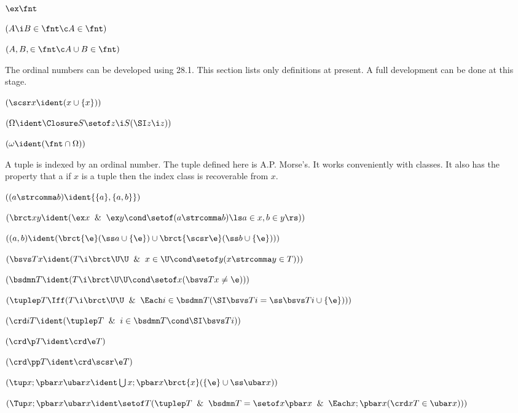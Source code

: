 

 $\ex\fnt$

 $(A\i  B \in \fnt \c A \in \fnt)$

 $(A,B, \in \fnt \c A \cup B\in \fnt)$
\lineb


The ordinal numbers can be developed using 28.1.  
This section lists only definitions at present.  A full development
can be done at this stage.
\lineb

 $(\scsr x \ident (x \cup \{x\}))$

 $(\Omega \ident \Closure S \setof z \i S (\SI z \i z))$

 $(\omega \ident (\fnt \cap \Omega))$
\lineb


	\lineb  

A tuple is indexed by an ordinal number.
The tuple defined here is A.P. Morse's.  It works conveniently with
classes.  It also has the property that a if $x$ is a tuple then
the index class is recoverable from $x$.  
\lineb




 $((a \strcomma b) \ident \{\{a\},\{a,b\}\})$
 
 $(\brct x y \ident (\ex x \And \ex y \cond\setof (a\strcomma b)\ls a \in x, b \in y\rs))$

 $((a, b) \ident (\brct \{\e\} (\ss a \cup\{\e\})\cup \brct \{\scsr \e\}(\ss b\cup\{\e\})))$

 $(\bsvs Tx \ident (T \i \brct \U \U \And x \in \U \cond \setof y 
(x\strcomma y\in T)))$

 $(\bsdmn T \ident (T \i \brct \U\U \cond \setof x (\bsvs Tx \ne \e)))$

 $(\tuplep T \Iff (T \i \brct \U\U \And \Each i \in \bsdmn T
(\SI \bsvs Ti = \ss \bsvs Ti \cup \{\e\})))$

 $(\crd i T \ident (\tuplep T \And i \in \bsdmn T \cond \SI \bsvs Ti))$

 $(\crd\p T \ident \crd \e T)$

 $(\crd\pp T \ident \crd \scsr\e T)$

 $(\tup x; \pbar x \ubar x \ident \bigcup x; \pbar x 
	\brct \{x\} (\{\e\}\cup \ss \ubar x))$ 

 $(\Tup x; \pbar x \ubar x \ident 
\setof T (\tuplep T \And \bsdmn T = \setof x \pbar x \And 
	\Each x; \pbar x (\crd x T \in \ubar x)))$


